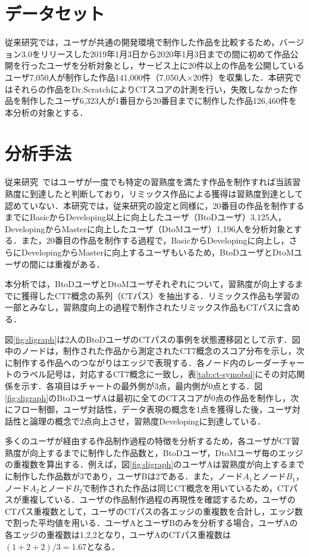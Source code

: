 \documentclass[submit,ses,noauthor]{ipsj}
\begin{document}
\section{データセット}\label{sec:chapter_3-1}
従来研究では，ユーザが共通の開発環境で制作した作品を比較するため，バージョン3.0をリリースした2019年1月3日から2020年1月3日までの間に初めて作品公開を行ったユーザを分析対象とし，サービス上に20件以上の作品を公開しているユーザ7,050人が制作した作品141,000件（7,050人×20件）を収集した．本研究ではそれらの作品をDr.ScratchによりCTスコアの計測を行い，失敗しなかった作品を制作したユーザ6,323人が1番目から20番目までに制作した作品126,460件を本分析の対象とする．


\section{分析手法}\label{sec:chapter_3-2}
従来研究~\cite{Ando_2021}ではユーザが一度でも特定の習熟度を満たす作品を制作すれば当該習熟度に到達したと判断しており，リミックス作品による獲得は習熟度到達として認めていない．本研究では，従来研究の設定と同様に，20番目の作品を制作するまでにBasicからDeveloping以上に向上したユーザ（BtoDユーザ）3,125人，DevelopingからMasterに向上したユーザ（DtoMユーザ）1,196人を分析対象とする．また，20番目の作品を制作する過程で，BasicからDevelopingに向上し，さらにDevelopingからMasterに向上するユーザもいるため，BtoDユーザとDtoMユーザの間には重複がある．

本分析では，BtoDユーザとDtoMユーザそれぞれについて，習熟度が向上するまでに獲得したCT7概念の系列（CTパス）を抽出する．リミックス作品も学習の一部とみなし，習熟度向上の過程で制作されたリミックス作品もCTパスに含める．

図\ref{fig:digraph}は2人のBtoDユーザのCTパスの事例を状態遷移図として示す．図中のノードは，制作された作品から測定されたCT7概念のスコア分布を示し，次に制作する作品へのつながりはエッジで表現する．各ノード内のレーダーチャートのラベル記号は，対応するCT7概念に一致し，表\ref{tab:ct-symobol}にその対応関係を示す．各項目はチャートの最外側が3点，最内側が0点とする．図\ref{fig:digraph}のBtoDユーザAは最初に全てのCTスコアが0点の作品を制作し，次にフロー制御，ユーザ対話性，データ表現の概念を1点を獲得した後，ユーザ対話性と論理の概念で2点向上させ，習熟度Developingに到達している．

多くのユーザが経由する作品制作過程の特徴を分析するため，各ユーザがCT習熟度が向上するまでに制作した作品数と，BtoDユーザ，DtoMユーザ毎のエッジの重複数を算出する．例えば，図\ref{fig:digraph}のユーザAは習熟度が向上するまでに制作した作品数が3であり，ユーザBは2である．また，ノード$A_1$とノード$B_1$，ノード$A_2$とノード$B_2$で制作された作品は同じCT概念を用いているため，CTパスが重複している．ユーザの作品制作過程の再現性を確認するため，ユーザのCTパス重複数として，ユーザのCTパスの各エッジの重複数を合計し，エッジ数で割った平均値を用いる．ユーザAとユーザBのみを分析する場合，ユーザAの各エッジの重複数は1,2,2となり，ユーザAのCTパス重複数は$(1 + 2 + 2) / 3 = 1.67$となる．
\end{document}
